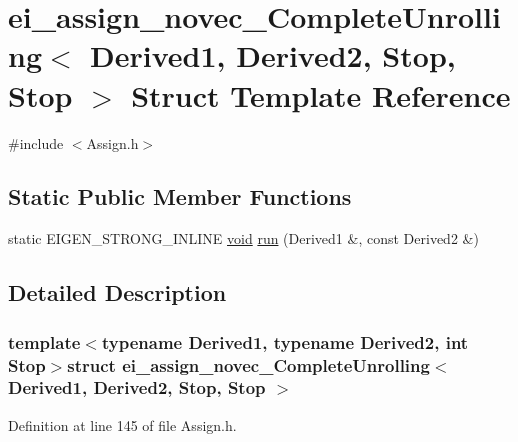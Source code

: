 \hypertarget{structei__assign__novec___complete_unrolling_3_01_derived1_00_01_derived2_00_01_stop_00_01_stop_01_4}{\section{ei\-\_\-assign\-\_\-novec\-\_\-\-Complete\-Unrolling$<$ Derived1, Derived2, Stop, Stop $>$ Struct Template Reference}
\label{structei__assign__novec___complete_unrolling_3_01_derived1_00_01_derived2_00_01_stop_00_01_stop_01_4}
}


{\ttfamily \#include $<$Assign.\-h$>$}

\subsection*{Static Public Member Functions}
\begin{DoxyCompactItemize}
\item 
static E\-I\-G\-E\-N\-\_\-\-S\-T\-R\-O\-N\-G\-\_\-\-I\-N\-L\-I\-N\-E \hyperlink{group___u_a_v_objects_plugin_ga444cf2ff3f0ecbe028adce838d373f5c}{void} \hyperlink{structei__assign__novec___complete_unrolling_3_01_derived1_00_01_derived2_00_01_stop_00_01_stop_01_4_ab9972c0f11c19950ad7deb77f86a3993}{run} (Derived1 \&, const Derived2 \&)
\end{DoxyCompactItemize}


\subsection{Detailed Description}
\subsubsection*{template$<$typename Derived1, typename Derived2, int Stop$>$struct ei\-\_\-assign\-\_\-novec\-\_\-\-Complete\-Unrolling$<$ Derived1, Derived2, Stop, Stop $>$}



Definition at line 145 of file Assign.\-h.



